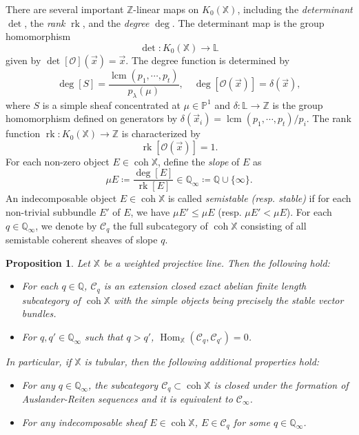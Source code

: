 \documentclass[11pt,a4paper,reqno]{amsart}%
\theoremstyle{plain}
\newtheorem{proposition}[proposition]{Proposition}
\theoremstyle{definition}
\numberwithin{equation}{section}
\numberwithin{equation}{section}
\def\ZZ{\mathbb{Z}}
\def\QQ{\mathbb{Q}}
\def\XX{\mathbb{X}}
\newcommand{\cC}{\mathcal{C}}
\newcommand{\QQi}{\mathbb{Q}_\infty}
\newcommand{\vx}{\vec{x}}
\newcommand{\lcm}{\operatorname{lcm}}
\newcommand{\rk}{\operatorname{rk}}
\newcommand{\Hom}{\operatorname{Hom}\nolimits}
\def\coh{\operatorname{coh}}
\def\Hom{\operatorname{Hom}}
\def\coh{\operatorname{coh}}
\begin{document}
There are several important $\mathbb{Z}$-linear maps on $K_0(\XX)$, including the \emph{determinant} $\det$, the \emph{rank} $\rk$, and the \emph{degree} $\deg$.
The determinant map is the group homomorphism
\[
\det \colon K_0(\XX) \to \mathbb{L}
\]
given by $\det[\mathcal{O}](\vec{x}) = \vec{x}$.
The degree function
is determined by
\[ \deg [S]=\frac{\lcm(p_{1}, \cdots, p_{t})}{p_\lambda(\mu)},\quad 
\deg[\mathcal{O}(\vec{x})] = \delta(\vec{x}),
\]
where $S$ is a simple sheaf concentrated at $\mu\in\mathbb{P}^1$  and $\delta: \mathbb{L} \to \ZZ$ is  the group homomorphism defined on generators by $\delta(\vx_{i}) = \lcm(p_{1}, \cdots, p_{t})/p_{i}$. 
 The rank function $\rk \colon K_0(\XX) \to \mathbb{Z}$ is characterized by
\[
\rk[\mathcal{O}(\vec{x})] = 1.
\] 
For each non-zero object $E \in \coh\XX$,  define the \emph{slope} of   $E$  as
\[
\mu E \coloneqq \frac{\deg [E]}{\rk [E]} \in \QQi\coloneqq \mathbb{Q} \cup \{\infty\}.
\]  
An indecomposable object $E \in \coh\XX$ is called \emph{semistable (resp. stable)} if for each non-trivial subbundle $E'$ of $E$, we have $\mu E' \leq \mu E$ (resp. $\mu E' <\mu E$). 
For each $q \in \QQi$, we denote by $\mathcal{C}_q$ the full subcategory of $\coh\XX$ consisting of all semistable coherent sheaves of slope $q$.
 


\begin{proposition} \label{coh:prp-stab} Let $\XX$ be a  weighted projective line.   Then the following hold:
\begin{itemize}
\item[(a)]
For each $q\in\QQ$, $\cC_q$ is an extension closed exact abelian finite length subcategory of
$\coh\XX$ with the simple objects being precisely the stable vector bundles.
\item[(b)] For $q, q' \in\QQi$ such that $q > q'$,
$\Hom_\XX(\cC_q,\cC_{q'})=0$.
 \end{itemize}
 In particular, if  $\XX$ is tubular, then the following additional properties hold:
\begin{itemize}
\item[(c)] 
For any $q\in\QQi$, the subcategory $\cC_q\subset\coh\XX$ 
 is closed under the formation of Auslander-Reiten sequences and it is equivalent to $\cC_\infty$.
\item[(d)]
For any indecomposable  sheaf $E\in\coh\XX$, $E\in\cC_q$ for some $q\in\QQi$.
\end{itemize}
\end{proposition}
\end{document}
